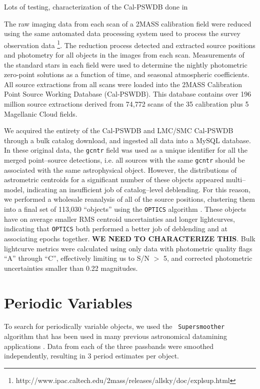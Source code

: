 \documentclass[]{emulateapj}
\begin{document}
Lots of testing, characterization of the Cal-PSWDB done in \citep{plavchanphd,plavchan2008a}

The raw imaging data from each scan of a 2MASS calibration field were reduced using the same automated data processing system used to process the survey observation data \footnote{http://www.ipac.caltech.edu/2mass/releases/allsky/doc/explsup.html}. The reduction process detected and extracted source positions and photometry for all objects in the images from each scan. Measurements of the standard stars in each field were used to determine the nightly photometric zero-point solutions as a function of time, and seasonal atmospheric coefficients. All source extractions from all scans were loaded into the 2MASS Calibration Point Source Working Database (Cal-PSWDB). This database contains over 196 million source extractions derived from 74,772 scans of the 35 calibration plus 5 Magellanic Cloud fields. 

We acquired the entirety of the Cal-PSWDB and LMC/SMC Cal-PSWDB
through a bulk catalog download, and ingested all data into a MySQL
database.  In these original data, the {\tt gcntr} field was used as a
unique identifier for all the merged point--source detections,
i.e. all sources with the same {\tt gcntr} should be associated with
the same astrophysical object.  However, the distributions of
astrometric centroids for a significant number of these objects
appeared multi--model, indicating an insufficient job of
catalog--level deblending.  For this reason, we performed a wholesale
reanalysis of all of the source positions, clustering them into a
final set of 113,030 ``objects'' using the {\tt OPTICS} algorithm
\cite{optics}.  These objects have on average smaller RMS centroid
uncertainties and longer lightcurves, indicating that {\tt OPTICS}
both performed a better job of deblending and at associating epochs
together.  {\bf WE NEED TO CHARACTERIZE THIS}.  Bulk lightcurve
metrics were calculated using only data with photometric quality flags
``A'' through ``C'', effectively limiting us to S/N $>$ 5, and corrected
photometric uncertainties smaller than 0.22 magnitudes.







\section{Periodic Variables}

To search for periodically variable objects, we used the {\tt
  Supersmoother} algorithm that has been used in many previous
astronomical datamining applications
\citep[e.g.][]{2011ApJ...731...17B}.  Data from each of the three
passbands were smoothed independently, resulting in 3 period estimates
per object.
\end{document}
